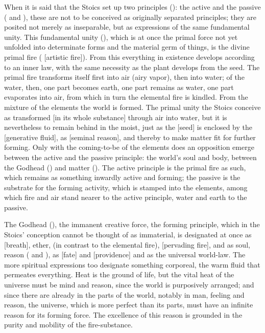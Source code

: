 When it is said that the Stoics set up two principles ():
the active and the passive ( and ),
these are not to be conceived as originally separated principles; they
are posited not merely as inseparable, but as expressions of the same
fundamental unity. This fundamental unity (), which is at
once the primal force not yet unfolded into determinate forms and the
material germ of things, is the divine primal fire (
[artistic fire]). From this everything in existence develops according
to an inner law, with the same necessity as the plant develops from the
seed. The primal fire transforms itself first into air (airy vapor), then
into water; of the water, then, one part becomes earth, one part remains
as water, one part evaporates into air, from which in turn the elemental
fire is kindled. From the mixture of the elements the world is formed.
The primal unity the Stoics conceive as transformed 
[in its whole substance] through air into water, but it is nevertheless
to remain behind in the moist, just as the  [seed] is enclosed
by the  [generative fluid], as  [seminal
reason], and thereby to make matter fit for further forming. Only with
the coming-to-be of the elements does an opposition emerge between the
active and the passive principle: the world's soul and body, between the
Godhead () and matter (). The active principle is the
primal fire as such, which remains as something inwardly active and
forming; the passive is the substrate for the forming activity, which is
stamped into the elements, among which fire and air stand nearer to the
active principle, water and earth to the passive.

The Godhead (), the immanent creative force, the forming
principle, which in the Stoics' conception cannot be thought of as
immaterial, is designated at once as  [breath], ether,
 (in contrast to the elemental fire), 
[pervading fire], and as soul, reason ( and ), as
 [fate] and  [providence] and as the universal
world-law. The more spiritual expressions too designate something
corporeal, the warm fluid that permeates everything. Heat is the ground
of life, but the vital heat of the universe must be mind and reason,
since the world is purposively arranged; and since there are already in
the parts of the world, notably in man, feeling and
reason, the universe, which is more perfect than its parts,
must have an infinite reason for its forming force.
The excellence of this reason is grounded in the purity and mobility of
the fire-substance.

